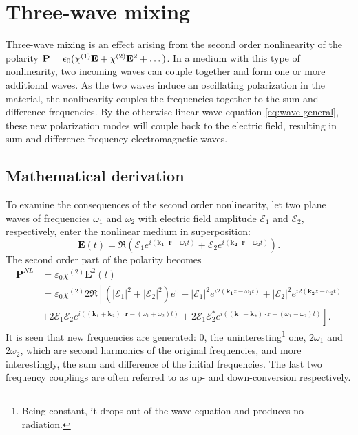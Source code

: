 \chapter{Three-wave mixing}
\label{cha:mixing}


Three-wave mixing is an effect arising from the second order
nonlinearity of the polarity $\mathbf P = \epsilon_0 ( \chi^{\textup{(1)}} \mathbf E +
\chi^{\textup{(2)}} \mathbf E^2 + \dots )$.
In a medium with this type of nonlinearity,
two incoming waves can couple together and form one or more additional waves.
As the two waves induce an oscillating polarization in the material,
the nonlinearity couples the frequencies together
to the sum and difference frequencies.
By the otherwise linear wave equation \eqref{eq:wave-general},
these new polarization modes will couple back to the electric field,
resulting in sum and difference frequency electromagnetic waves.

\section{Mathematical derivation}
\label{sec:mixing-math}

To examine the consequences of the second order nonlinearity,
let two plane waves of frequencies $\omega_1$ and $\omega_2$ with electric field amplitude $\mathcal{E}_1$ and $\mathcal{E}_2$, respectively,
enter the nonlinear medium in superposition: 
\[
     \mathbf{\mathbf{E}}(t) = \Re\left(\mathcal{E}_1e^{i(\mathbf{k_1} \cdot \mathbf{r} - \omega_1 t)}+\mathcal{E}_2e^{i(\mathbf{k_2} \cdot \mathbf{r} - \omega_2 t)} \right).
\]
The second order part of the polarity becomes\cite[sec.~21.2C]{saleh}
\begin{align}
     \mathbf{P}^{NL} & = \varepsilon_0 \chi^{(2)} \mathbf{E}^2(t) \nonumber \\
&= \varepsilon_0 \chi^{(2)} 2 \Re \left[
\left(|\mathcal{E}_1|^2+|\mathcal{E}_2|^2\right)e^{0} + |\mathcal{E}_1|^2e^{i2(\mathbf{k_1} z - \omega_1t)}+|\mathcal{E}_2|^2e^{i2(\mathbf{k_2} z - \omega_2t)} \right.\nonumber \\
& \left.
+ 2\mathcal{E}_1 \mathcal{E}_2e^{i((\mathbf{k_1} + \mathbf{k_2}) \cdot \mathbf{r} - (\omega_1+\omega_2)t)} 
+ 2\mathcal{E}_1 \mathcal{E}_2^*e^{i((\mathbf{k_1} - \mathbf{k_2}) \cdot \mathbf{r} - (\omega_1-\omega_2)t)} 
\right] \label{eq:MixPNL}.
\end{align}
It is seen that new frequencies are generated: $0$, the uninteresting\footnote{Being constant, it drops out of the wave equation and produces no radiation.} one, $2\omega_1$ and $2\omega_2$, which are second harmonics of the original frequencies, and more interestingly, the sum and difference of the initial frequencies. The last two frequency couplings are often referred to as up- and down-conversion respectively.

